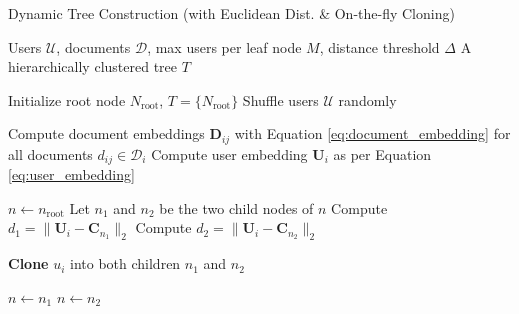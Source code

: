 \documentclass[10pt,journal]{IEEEtran}
\begin{document}


\begin{algorithm}[]
\caption{Dynamic Tree Construction (with Euclidean Dist. \& On-the-fly Cloning)}
\label{alg:dynamic_tree_construction}
\begin{algorithmic}[1]
\REQUIRE Users $\mathcal{U}$, documents $\mathcal{D}$, max users per leaf node $M$, distance threshold $\Delta$
\ENSURE A hierarchically clustered tree $T$ 

\STATE Initialize root node $N_{\mathrm{root}}$, $T = \{N_{\mathrm{root}}\}$
\STATE Shuffle users $\mathcal{U}$ randomly

    \STATE Compute document embeddings $\mathbf{D}_{ij}$ with Equation \ref{eq:document_embedding} for all documents $d_{ij} \in \mathcal{D}_i$
    \STATE Compute user embedding $\mathbf{U}_i$ as per Equation \ref{eq:user_embedding}

    \STATE $n \leftarrow n_{\mathrm{root}}$ \quad {}
        \STATE Let $n_1$ and $n_2$ be the two child nodes of $n$
        \STATE Compute $d_1 = \|\mathbf{U}_i - \mathbf{C}_{n_1}\|_{2}$ \quad {}
        \STATE Compute $d_2 = \|\mathbf{U}_i - \mathbf{C}_{n_2}\|_{2}$

        \STATE {}
            \STATE {}
            \STATE \textbf{Clone} $u_i$ into both children $n_1$ and $n_2$
        \ENDIF

        \STATE {}
            \STATE $n \leftarrow n_1$
        \ELSE
            \STATE $n \leftarrow n_2$
        \ENDIF
    \ENDWHILE


\end{algorithmic}
\end{algorithm}
\end{document}
